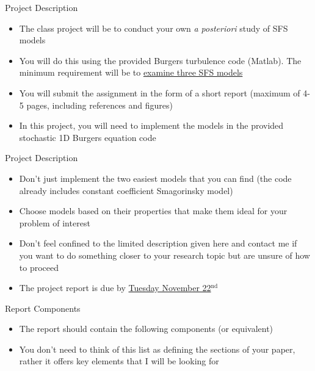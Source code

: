 \begin{frame}{Project Description}
\begin{itemize}
	\item The class project will be to conduct your own {\it a posteriori} study of SFS models
	\item You will do this using the provided Burgers turbulence code (Matlab). The minimum requirement will be to \underline{examine three SFS models}
	\item You will submit the assignment in the form of a short report (maximum of 4-5 pages, including references and figures)
	\item In this project, you will need to implement the models in the provided stochastic 1D Burgers equation code
\end{itemize}
\end{frame}

\begin{frame}{Project Description}
\begin{itemize}
	\item Don't just implement the two easiest models that you can find (the code already includes constant coefficient Smagorinsky model)
	\item Choose models based on their properties that make them ideal for your problem of interest
	\item Don't feel confined to the limited description given here and contact me if you want to do something closer to your research topic but are unsure of how to proceed
	\item The project report is due by \underline{Tuesday November 22$^{\text{nd}}$}
\end{itemize}
\end{frame}

\begin{frame}{Report Components}
\begin{itemize}
	\item The report should contain the following components (or equivalent)
	\item You don't need to think of this list as defining the sections of your paper, rather it offers key elements that I will be looking for
\end{itemize}
\end{frame}

